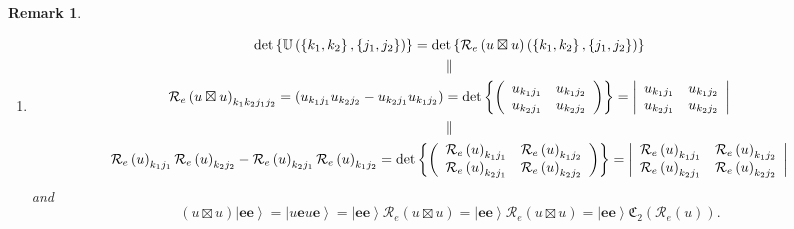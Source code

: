\documentclass[aps,preprint]{revtex4}%
\newtheorem{remark}[theorem]{Remark}
\begin{document}
\begin{remark}
\begin{enumerate}
\item
\begin{gather}
\det\left\{  \mathbb{U}\left(  \left\{  k_{1},k_{2}\right\}  ,\left\{
j_{1},j_{2}\right\}  \right)  \right\}  =\det\left\{  \mathcal{R}_{e}\left(
u\boxtimes u\right)  \left(  \left\{  k_{1},k_{2}\right\}  ,\left\{
j_{1},j_{2}\right\}  \right)  \right\} \\
\parallel\\
\mathcal{R}_{e}\left(  u\boxtimes u\right)  _{k_{1}k_{2}j_{1}j_{2}}=\left(
u_{k_{1}j_{1}}u_{k_{2}j_{2}}-u_{k_{2}j_{1}}u_{k_{1}j_{2}}\right)
=\det\left\{  \left(
\begin{array}
[c]{cc}%
u_{k_{1}j_{1}} & u_{k_{1}j_{2}}\\
u_{k_{2}j_{1}} & u_{k_{2}j_{2}}%
\end{array}
\right)  \right\}  =\left\vert
\begin{array}
[c]{cc}%
u_{k_{1}j_{1}} & u_{k_{1}j_{2}}\\
u_{k_{2}j_{1}} & u_{k_{2}j_{2}}%
\end{array}
\right\vert \\
\parallel\\
\mathcal{R}_{e}\left(  u\right)  _{k_{1}j_{1}}\mathcal{R}_{e}\left(  u\right)
_{k_{2}j_{2}}-\mathcal{R}_{e}\left(  u\right)  _{k_{2}j_{1}}\mathcal{R}%
_{e}\left(  u\right)  _{k_{1}j_{2}}=\det\left\{  \left(
\begin{array}
[c]{cc}%
\mathcal{R}_{e}\left(  u\right)  _{k_{1}j_{1}} & \mathcal{R}_{e}\left(
u\right)  _{k_{1}j_{2}}\\
\mathcal{R}_{e}\left(  u\right)  _{k_{2}j_{1}} & \mathcal{R}_{e}\left(
u\right)  _{k_{2}j_{2}}%
\end{array}
\right)  \right\}  =\left\vert
\begin{array}
[c]{cc}%
\mathcal{R}_{e}\left(  u\right)  _{k_{1}j_{1}} & \mathcal{R}_{e}\left(
u\right)  _{k_{1}j_{2}}\\
\mathcal{R}_{e}\left(  u\right)  _{k_{2}j_{1}} & \mathcal{R}_{e}\left(
u\right)  _{k_{2}j_{2}}%
\end{array}
\right\vert
\end{gather}
and
\begin{equation}
\left(  u\boxtimes u\right)  \left\vert \mathbf{ee}\right\rangle =\left\vert
u\mathbf{e}u\mathbf{e}\right\rangle =\left\vert \mathbf{ee}\right\rangle
\mathcal{R}_{e}\left(  u\boxtimes u\right)  =\left\vert \mathbf{ee}%
\right\rangle \mathcal{R}_{e}\left(  u\boxtimes u\right)  =\left\vert
\mathbf{ee}\right\rangle \mathfrak{C}_{2}\left(  \mathcal{R}_{e}\left(
u\right)  \right)  .
\end{equation}



\end{enumerate}
\end{remark}
\end{document}
